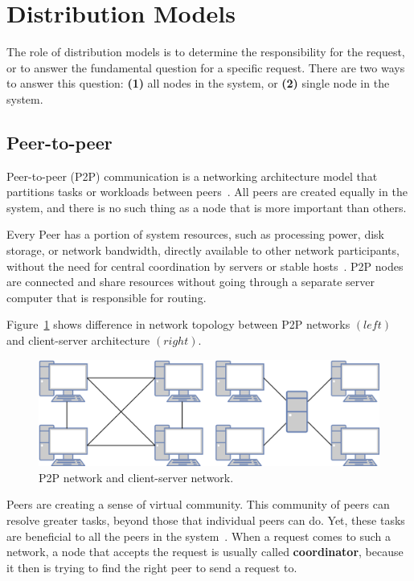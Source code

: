 \section{Distribution Models}\label{sec:distribution_models}
%
The role of distribution models is to determine the responsibility for the request, or to answer the fundamental question  for a specific request. There are two ways to answer this question: \textbf{(1)} all nodes in the system, or \textbf{(2)} single node in the system.
%
%
\subsection{Peer-to-peer}\label{sec:p2p_networks}
%
Peer-to-peer (P2P) communication is a networking architecture model that partitions tasks or workloads between peers~\cite{Schollmeier01}. All peers are created equally in the system, and there is no such thing as a node that is more important than others. 

Every Peer has a portion of system resources, such as processing power, disk storage, or network bandwidth, directly available to other network participants, without the need for central coordination by servers or stable hosts~\cite{Schollmeier01}. P2P nodes are connected and share resources without going through a separate server computer that is responsible for routing. 

Figure~\ref{fig:fig2} shows difference in network topology between P2P networks $(left)$ and client-server architecture $(right)$.

\begin{figure}[H]
	\begin{center}
		\includegraphics[scale=0.7]{images/Figure2.png}
	\end{center}
	\vspace{-0.6cm}
	\caption{P2P network and client-server network.}
	\label{fig:fig2}
\end{figure}

\noindent
Peers are creating a sense of virtual community. This community of peers can resolve greater tasks, beyond those that individual peers can do. Yet, these tasks are beneficial to all the peers in the system~\cite{BandaraJ13}. When a request comes to such a network, a node that accepts the request is usually called \textbf{coordinator}, because it then is trying to find the right peer to send a request to.

